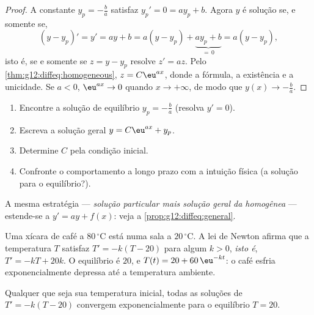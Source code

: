 \begin{proof}
A constante $y_p = -\frac{b}{a}$ satisfaz $y_p' = 0 = a y_p + b$. Agora
$y$ é solução se, e somente se,
\[
(y - y_p)' = y' = ay + b = a(y - y_p) + \underbrace{a y_p + b}_{=\,0}
= a (y - y_p),
\]
isto é, se e somente se $z = y - y_p$ resolve $z' = az$. Pelo
\cref{thm:g12:diffeq:homogeneous}, $z = C\eu^{ax}$, donde a fórmula, a
existência e a unicidade. Se $a < 0$, $\eu^{ax} \to 0$ quando
$x \to +\infty$, de modo que $y(x) \to -\frac ba$.
\end{proof}

\begin{method}[Resolver $y' = ay + b$ com condição inicial]\label{met:g12:diffeq:solve}
\begin{enumerate}
  \item Encontre a solução de equilíbrio $y_p = -\frac{b}{a}$ (resolva
        $y' = 0$).
  \item Escreva a solução geral $y = C\eu^{ax} + y_p$.
  \item Determine $C$ pela condição inicial.
  \item Confronte o comportamento a longo prazo com a intuição física (a
        solução  para o equilíbrio?).
\end{enumerate}
A mesma estratégia --- \emph{solução particular mais solução geral da
 homogênea} --- estende-se a $y' = ay + f(x)$: veja a
\cref{prop:g12:diffeq:general}.
\end{method}

\begin{example}\label{ex:g12:diffeq:cooling}
Uma xícara de café a $80\,^\circ$C está numa sala a $20\,^\circ$C. A lei
de Newton afirma que a temperatura $T$ satisfaz $T' = -k(T - 20)$ para
algum $k > 0$, \emph{isto é}, $T' = -kT + 20k$. O equilíbrio é $20$, e
$T(t) = 20 + 60\,\eu^{-kt}$: o café esfria exponencialmente depressa até a
temperatura ambiente.
\end{example}

\begin{omfigure}

{\small Qualquer que seja sua temperatura inicial, todas as soluções de
$T' = -k(T - 20)$ convergem exponencialmente para o equilíbrio
$T = 20$.}
\end{omfigure}

